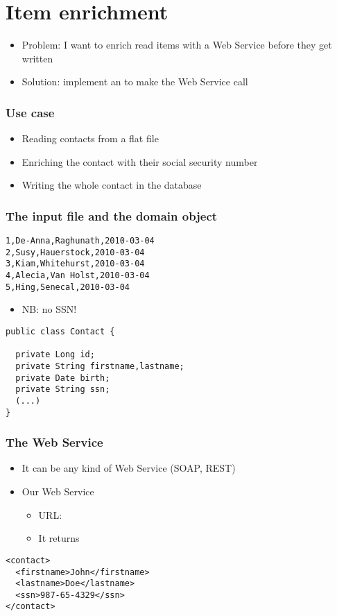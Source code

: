 \section{Item enrichment}

\begin{frame}
 \begin{itemize}
  \item Problem: I want to enrich read items with a Web Service before they get written
  \item Solution: implement an  to make the Web Service call
 \end{itemize}
\end{frame}

\begin{frame}
 \frametitle{Use case}
 \begin{itemize}
  \item Reading contacts from a flat file
  \item Enriching the contact with their social security number  
  \item Writing the whole contact in the database
 \end{itemize}
\end{frame}


\begin{frame}[fragile]
\frametitle{The input file and the domain object}
\begin{lstlisting}
1,De-Anna,Raghunath,2010-03-04
2,Susy,Hauerstock,2010-03-04
3,Kiam,Whitehurst,2010-03-04
4,Alecia,Van Holst,2010-03-04
5,Hing,Senecal,2010-03-04
\end{lstlisting}
\begin{itemize}
 \item NB: no SSN!
\end{itemize}
\lstset{language=Java}
\begin{lstlisting}
public class Contact {

  private Long id;	
  private String firstname,lastname;	
  private Date birth;	
  private String ssn;
  (...)
}
\end{lstlisting}
\end{frame}

\begin{frame}[fragile]
\frametitle{The Web Service}
\begin{itemize}
 \item It can be any kind of Web Service (SOAP, REST)
 \item Our Web Service
 \begin{itemize}
    \item URL: 
    \item It returns
 \end{itemize} 
\end{itemize}

\lstset{language=XML}
\begin{lstlisting}
<contact>
  <firstname>John</firstname>
  <lastname>Doe</lastname>
  <ssn>987-65-4329</ssn>
</contact>
\end{lstlisting}
\end{frame}

